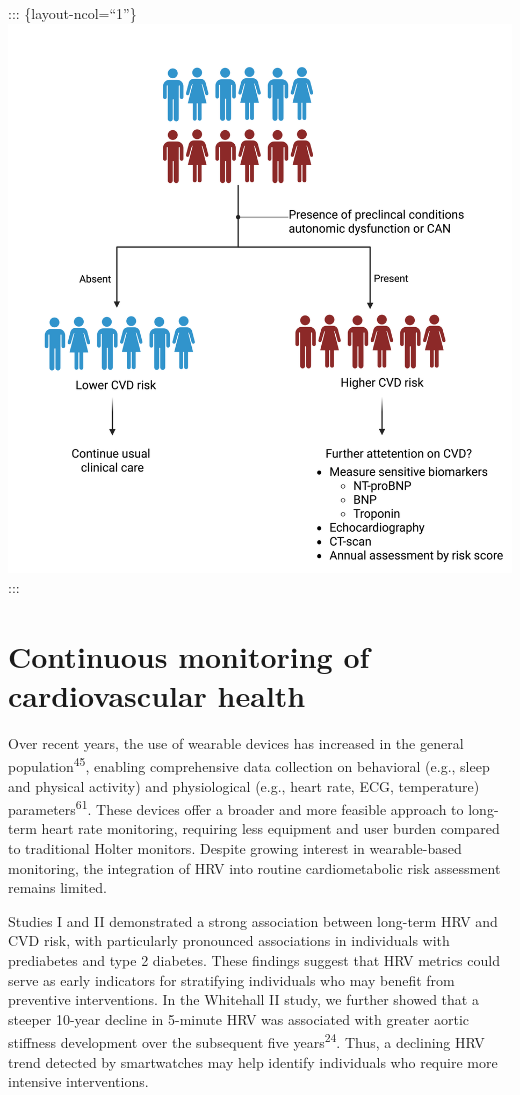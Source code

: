 \documentclass[
  a4paper,
  headsepline=true,
  open=any]{scrbook}
\begin{document}
::: \{layout-ncol=``1''\}
\includegraphics{images/strafication_tree_of_CAN.png} :::

\hypertarget{continuous-monitoring-of-cardiovascular-health}{%
\section{Continuous monitoring of cardiovascular
health}\label{continuous-monitoring-of-cardiovascular-health}}

Over recent years, the use of wearable devices has increased in the
general population\textsuperscript{45}, enabling comprehensive data
collection on behavioral (e.g., sleep and physical activity) and
physiological (e.g., heart rate, ECG, temperature)
parameters\textsuperscript{61}. These devices offer a broader and more
feasible approach to long-term heart rate monitoring, requiring less
equipment and user burden compared to traditional Holter monitors.
Despite growing interest in wearable-based monitoring, the integration
of HRV into routine cardiometabolic risk assessment remains limited.

Studies I and II demonstrated a strong association between long-term HRV
and CVD risk, with particularly pronounced associations in individuals
with prediabetes and type 2 diabetes. These findings suggest that HRV
metrics could serve as early indicators for stratifying individuals who
may benefit from preventive interventions. In the Whitehall II study, we
further showed that a steeper 10-year decline in 5-minute HRV was
associated with greater aortic stiffness development over the subsequent
five years\textsuperscript{24}. Thus, a declining HRV trend detected by
smartwatches may help identify individuals who require more intensive
interventions.
\end{document}
